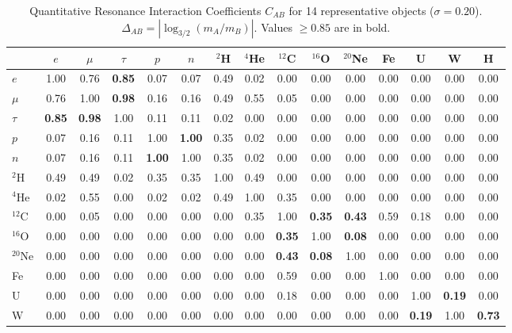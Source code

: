 \documentclass[11pt,a4paper]{article}
\begin{document}
	\begin{table}[H]
		\centering
		\caption{Quantitative Resonance Interaction Coefficients \(C_{AB}\) for 14 representative objects (\(\sigma = 0.20\)). \(\Delta_{AB} = |\log_{3/2}(m_A/m_B)|\). Values \(\ge 0.85\) are in bold.}
		\label{tab:CAB}
		\scriptsize
		\begin{tabular}{l c c c c c c c c c c c c c c}
			\toprule
			& \(e\) & \(\mu\) & \(\tau\) & \(p\) & \(n\) & \(^2\)H & \(^4\)He & \(^{12}\)C & \(^{16}\)O & \(^{20}\)Ne & Fe & U & W & H \\
			\midrule
			\(e\) & 1.00 & 0.76 & \textbf{0.85} & 0.07 & 0.07 & 0.49 & 0.02 & 0.00 & 0.00 & 0.00 & 0.00 & 0.00 & 0.00 & 0.00 \\
			\(\mu\) & 0.76 & 1.00 & \textbf{0.98} & 0.16 & 0.16 & 0.49 & 0.55 & 0.05 & 0.00 & 0.00 & 0.00 & 0.00 & 0.00 & 0.00 \\
			\(\tau\) & \textbf{0.85} & \textbf{0.98} & 1.00 & 0.11 & 0.11 & 0.02 & 0.00 & 0.00 & 0.00 & 0.00 & 0.00 & 0.00 & 0.00 & 0.00 \\
			\(p\) & 0.07 & 0.16 & 0.11 & 1.00 & \textbf{1.00} & 0.35 & 0.02 & 0.00 & 0.00 & 0.00 & 0.00 & 0.00 & 0.00 & 0.00 \\
			\(n\) & 0.07 & 0.16 & 0.11 & \textbf{1.00} & 1.00 & 0.35 & 0.02 & 0.00 & 0.00 & 0.00 & 0.00 & 0.00 & 0.00 & 0.00 \\
			\(^2\)H & 0.49 & 0.49 & 0.02 & 0.35 & 0.35 & 1.00 & 0.49 & 0.00 & 0.00 & 0.00 & 0.00 & 0.00 & 0.00 & 0.00 \\
			\(^4\)He & 0.02 & 0.55 & 0.00 & 0.02 & 0.02 & 0.49 & 1.00 & 0.35 & 0.00 & 0.00 & 0.00 & 0.00 & 0.00 & 0.00 \\
			\(^{12}\)C & 0.00 & 0.05 & 0.00 & 0.00 & 0.00 & 0.00 & 0.35 & 1.00 & \textbf{0.35} & \textbf{0.43} & 0.59 & 0.18 & 0.00 & 0.00 \\
			\(^{16}\)O & 0.00 & 0.00 & 0.00 & 0.00 & 0.00 & 0.00 & 0.00 & \textbf{0.35} & 1.00 & \textbf{0.08} & 0.00 & 0.00 & 0.00 & 0.00 \\
			\(^{20}\)Ne & 0.00 & 0.00 & 0.00 & 0.00 & 0.00 & 0.00 & 0.00 & \textbf{0.43} & \textbf{0.08} & 1.00 & 0.00 & 0.00 & 0.00 & 0.00 \\
			Fe & 0.00 & 0.00 & 0.00 & 0.00 & 0.00 & 0.00 & 0.00 & 0.59 & 0.00 & 0.00 & 1.00 & 0.00 & 0.00 & 0.00 \\
			U & 0.00 & 0.00 & 0.00 & 0.00 & 0.00 & 0.00 & 0.00 & 0.18 & 0.00 & 0.00 & 0.00 & 1.00 & \textbf{0.19} & 0.00 \\
			W & 0.00 & 0.00 & 0.00 & 0.00 & 0.00 & 0.00 & 0.00 & 0.00 & 0.00 & 0.00 & 0.00 & \textbf{0.19} & 1.00 & \textbf{0.73} \\

\end{tabular}
\end{table}
\end{document}
